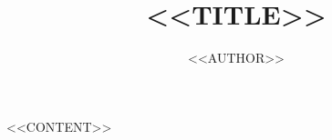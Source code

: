 \documentclass[10pt,twoside]{ltjtarticle}
\title{<<TITLE>>}
\author{<<AUTHOR>>}
\date{} %
\begin{document}
\maketitle

<<CONTENT>>
\end{document}
